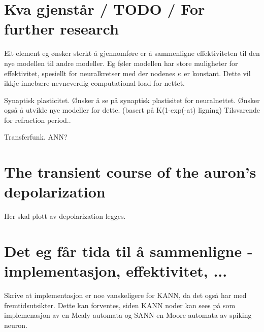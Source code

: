 \section{Kva gjenstår / TODO / For further research}
Eit element eg ønsker sterkt å gjennomføre er å sammenligne effektiviteten til den nye modellen til andre modeller. Eg føler modellen har store muligheter for effektivitet, spesiellt for neuralkretser med der nodenes $\kappa$ er konstant.
Dette vil ikkje innebære nevneverdig computational load for nettet.

Synaptisk plasticitet. Ønsker å se på synaptisk plastisitet for neuralnettet.
Ønsker også å utvikle nye modeller for dette. (basert på K(1-exp(-at) ligning)
Tilsvarende for refraction period..

Transferfunk. ANN?















	\section{ The transient course of the auron's depolarization }
	Her skal plott av depolarization legges.

	\section{ Det eg får tida til å sammenligne - implementasjon, effektivitet, ...}
	Skrive at implementasjon er noe vanskeligere for KANN, da det også har med fremtidsutsikter. Dette kan forventes, siden KANN noder kan sees på som implemenasjon av en Mealy automata og SANN en Moore automata av spiking neuron.

